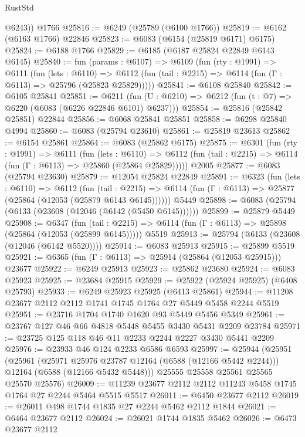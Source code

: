 \begin{lexlean}{RustStd}
\begin{coremodule}
        @6243))
    @1766
@25816 := @6249 (@25789 (@6100 @1766))
@25819 := @6162 (@6163 @1766) @22846
@25823 := @6083 (@6154 (@25819 @6171) @6175)
@25824 := @6188 @1766
@25829 := @6185 (@6187 @25824 @22849 @6143 @6145)
@25840 := fun (params : @6107) =>
  @6109
    (fun (rty : @1991) =>
    @6111
      (fun (lets : @6110) =>
      @6112 (fun (tail : @2215) => @6114 (fun (Γ : @6113) => @25796 (@25823 @25829)))))
@25841 := @6108 @25840
@25842 := @6105 @25841
@25851 := @6211
    (fun (U : @6210) => @6212 (fun (t : @7) => @6220 (@6083 (@6226 @22846 @6101) @6237)))
@25854 := @25816 (@25842 @25851) @22844
@25856 := @6068 @25841 @25851
@25858 := @6298 @25840 @4994
@25860 := @6083 (@25794 @23610)
@25861 := @25819 @23613
@25862 := @6154 @25861
@25864 := @6083 (@25862 @6175)
@25875 := @6301
    (fun (rty : @1991) =>
    @6111
      (fun (lets : @6110) =>
      @6112 (fun (tail : @2215) => @6114 (fun (Γ : @6113) => @25860 (@25864 @25829)))))
    @2005
@25877 := @6083 (@25794 @23630)
@25879 := @12054 @25824 @22849
@25891 := @6323
    (fun (lets : @6110) =>
    @6112
      (fun (tail : @2215) =>
      @6114 (fun (Γ : @6113) => @25877 (@25864 (@12053 (@25879 @6143 @6145))))))
    @5449
@25898 := @6083 (@25794 (@6133 (@23608 (@12046 (@6142 (@5450 @6145))))))
@25899 := @25879 @5449
@25908 := @6347
    (fun (tail : @2215) => @6114 (fun (Γ : @6113) => @25898 (@25864 (@12053 (@25899 @6145)))))
    @5519
@25913 := @25794 (@6133 (@23608 (@12046 (@6142 @5520))))
@25914 := @6083 @25913
@25915 := @25899 @5519
@25921 := @6365 (fun (Γ : @6113) => @25914 (@25864 (@12053 @25915))) @23677
@25922 := @6249 @25913
@25923 := @25862 @23680
@25924 := @6083 @25923
@25925 := @23684 @25915
@25929 := @25922 (@25924 @25925) (@6408 @25793)
@25933 := @6249 @25923 @25925 (@6413 @25861)
@25944 := @11208 @23677 @2112 @2112 @1741 @1745 @1764 @27 @5449 @5458 @2244 @5519
@25951 := @23716 @1704 @1740 @1620 @93 @5449 @5456 @5349
@25961 := @23767 @127 @46 @66 @4818 @5448 @5455 @3430 @5431 @2209 @23784
@25971 := @23725 @125 @118 @46 @11 @2233 @2244 @2227 @3430 @5441 @2209
@25976 := @23933 @46 @124 @2233 @6586 @6593
@25997 := @25944
    (@25951
      (@25961
        (@25971 @25976 @23787 @12164 (@6588 (@12166 @5442 @2244)))
        @12164
        (@6588 (@12166 @5432 @5448)))
      @25555
      @25558
      @25561
      @25565
      @25570
      @25576)
@26009 := @11239 @23677 @2112 @2112 @11243 @5458 @1745 @1764 @27 @2244 @5464 @5515 @5517
@26011 := @6450 @23677 @2112
@26019 := @26011 @498 @1744 @1835 @27 @2244 @5462 @2112 @1844
@26021 := @6464 @23677 @2112
@26024 := @26021 @1744 @1835 @5462
@26026 := @6473 @23677 @2112

\end{coremodule}
\end{lexlean}
